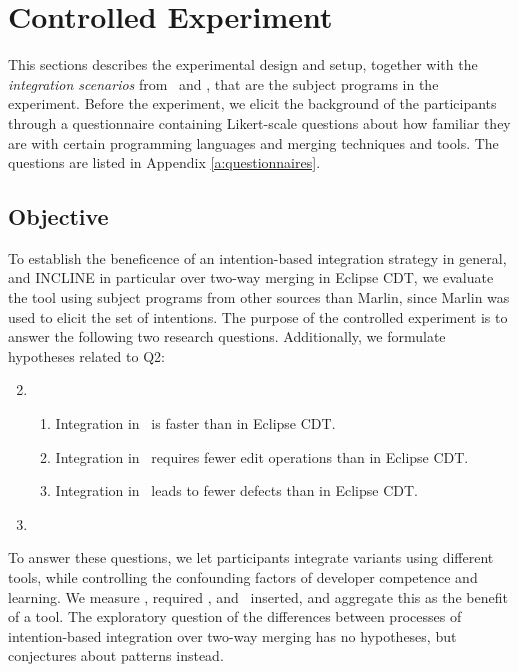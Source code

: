 \section{Controlled Experiment}
This sections describes the experimental design and setup, together with the \textit{integration scenarios} from \busybox~and \vim, that are the subject programs in the experiment. Before the experiment, we elicit the background of the participants through a questionnaire containing Likert-scale questions about how familiar they are with certain programming languages and merging techniques and tools. The questions are listed in Appendix \ref{a:questionnaires}.

\newcommand{\HA}{Integration in \tooln~is faster than in Eclipse CDT}
\newcommand{\HB}{Integration in \tooln~requires fewer edit operations than in Eclipse CDT}
\newcommand{\HC}{Integration in \tooln~leads to fewer defects than in Eclipse CDT}

\subsection{Objective}
To establish the beneficence of an intention-based integration strategy in general, and INCLINE in particular over two-way merging in Eclipse CDT, we evaluate the tool using subject programs from other sources than Marlin, since Marlin was used to elicit the set of intentions. The purpose of the controlled experiment is to answer the following two research questions. Additionally, we formulate hypotheses related to Q2:

\begin{enumerate}[label={Q\arabic*}]
    \setcounter{enumi}{1}
    \item \RQB
    \begin{enumerate}[label={H\arabic*}]
        \item \HA.
        \item \HB.
        \item \HC.
    \end{enumerate}
    \item \RQC
\end{enumerate}

To answer these questions, we let participants integrate variants using different tools, while controlling the confounding factors of developer competence and learning. We measure \ctime, required \eops, and ~inserted, and aggregate this as the benefit of a tool. The exploratory question of the differences between processes of intention-based integration over two-way merging has no hypotheses, but conjectures about patterns instead.

